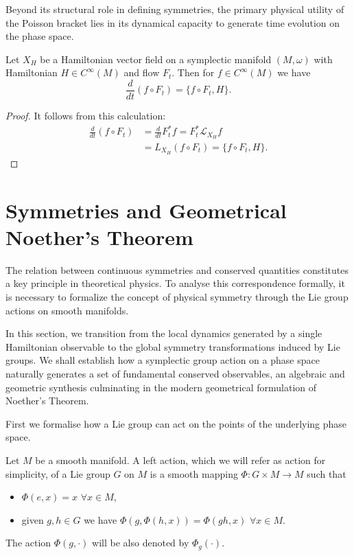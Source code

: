 Beyond its structural role in defining symmetries, the primary physical utility of the Poisson bracket lies in its dynamical capacity to generate time evolution on the phase space. 

\begin{proposition}
	Let $X_H$ be a Hamiltonian vector field on a symplectic manifold $(M, \omega)$ with Hamiltonian $H \in C^\infty(M)$ and flow $F_t$. Then for $f \in C^\infty(M)$ we have
	\[
	\frac{d}{dt} (f \circ F_t) = \{f \circ F_t, H\}.
	\]
\end{proposition}

\begin{proof}
	It follows from this calculation:
	\begin{align*}
		\frac{d}{dt} (f \circ F_t) &= \frac{d}{dt} F_t^* f = F_t^* \mathscr{L}_{X_H} f \\
		&= L_{X_H} (f \circ F_t) = \{f \circ F_t, H\}.
	\end{align*}
\end{proof}

\section{Symmetries and Geometrical Noether's Theorem}

The relation between continuous symmetries and conserved quantities constitutes a key principle in theoretical physics. To analyse this correspondence formally, it is necessary to formalize the concept of physical symmetry through the Lie group actions on smooth manifolds. 

In this section, we transition from the local dynamics generated by a single Hamiltonian observable to the global symmetry transformations induced by Lie groups. We shall establish how a symplectic group action on a phase space naturally generates a set of fundamental conserved observables, an algebraic and geometric synthesis culminating in the modern geometrical formulation of Noether's Theorem.

First we formalise how a Lie group can act on the points of the underlying phase space.

\begin{definition}\label{def:action}
	Let $M$ be a smooth manifold. A left action, which we will refer as action for simplicity, of a Lie group $G$ on $M$ is a smooth mapping $\Phi: G \times M \to M$ such that
	\begin{itemize}
		\item $\Phi(e,x) = x$ $\forall x \in M$,
		\item given $g,h \in G$ we have $\Phi(g, \Phi(h,x)) = \Phi(gh,x)$ $\forall x \in M$.
	\end{itemize}
	The action $\Phi(g, \cdot)$ will be also denoted by $\Phi_g(\cdot)$.
\end{definition}


